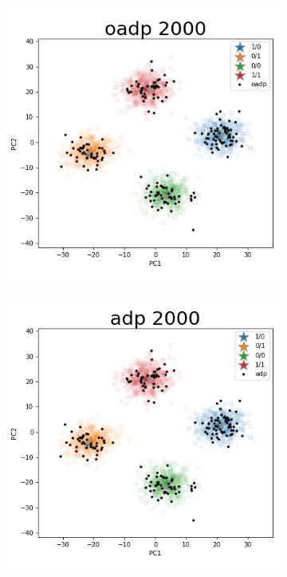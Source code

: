 \documentclass{article}
\begin{document}
\begin{figure}[p]
\begin{subfigure}{.5\textwidth}
\end{subfigure}
\hfill
\begin{subfigure}{.5\textwidth}
  \centering
  \includegraphics[width=.98\linewidth]{img/ggsim2000_100000_200_2_1_100_1_sturef_ggsim2000_100000_2000_2_1_100_0_oadp}
\end{subfigure}%
\begin{subfigure}{.5\textwidth}
  \centering
  \includegraphics[width=.98\linewidth]{img/ggsim2000_100000_200_2_1_100_1_sturef_ggsim2000_100000_2000_2_1_100_0_adp}
\end{subfigure}
\end{figure}
\end{document}
